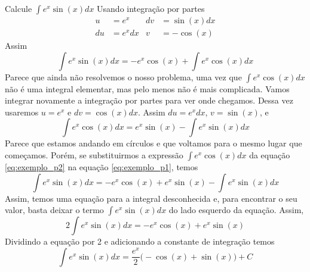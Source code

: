 \begin{example}
  Calcule \(\int e^x \sin(x) dx\)
  \solution
  Usando integração por partes
  \begin{align*}
    u  & = e^x   & dv & = \sin(x) dx \\
    du & = e^xdx & v  & = -\cos(x)
  \end{align*}
  Assim
  \begin{equation}
    \label{eq:exemplo_p1}
    \int e^x \sin(x) dx = -e^x \cos(x)+ \int e^x \cos(x)dx
  \end{equation}
  Parece que ainda não resolvemos o nosso problema, uma vez que
  \(\int e^x \cos(x) dx\) não é uma integral elementar, mas pelo menos
  não é mais complicada. Vamos integrar novamente a integração por
  partes para ver onde chegamos. Dessa vez usaremos $u=e^x$ e
  $dv=\cos(x)dx$. Assim $du=e^x dx$, $v=\sin(x)$, e
  \begin{equation}
    \label{eq:exemplo_p2}
    \int e^x \cos(x) dx= e^x \sin(x)-\int e^x \sin(x) dx
  \end{equation}
  Parece que estamos andando em círculos e que voltamos para o
  mesmo lugar que começamos.
  Porém, se substituirmos a expressão
  \(
    \int e^x \cos(x)dx
  \) da
  equação \eqref{eq:exemplo_p2} na
  equação \eqref{eq:exemplo_p1}, temos
  \[
    \int e^x \sin(x) dx
    = -e^x \cos(x)+ e^x \sin(x)-\int e^x \sin(x) dx
  \]
  Assim, temos uma equação para a integral desconhecida e,
  para encontrar o seu valor, basta deixar o termo
  \(\int e^x \sin(x) dx\) do lado esquerdo da equação. Assim,
  \[
    2\int e^x \sin(x) dx = -e^x \cos(x)+ e^x \sin(x)
  \]
  Dividindo a equação por 2 e adicionando a constante de integração temos
  \[
    \int e^x \sin(x) dx = \frac{e^x}{2}\big( -\cos(x) +\sin(x) \big) + C
  \]
\end{example}

